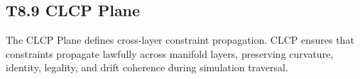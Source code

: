 \subsection{T8.9 CLCP Plane}
The CLCP Plane defines cross‑layer constraint propagation. CLCP ensures that
constraints propagate lawfully across manifold layers, preserving curvature,
identity, legality, and drift coherence during simulation traversal.
